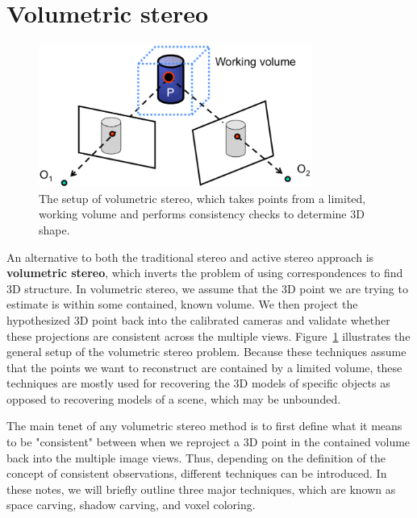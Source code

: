 \documentclass[a4paper, 12pt]{article}
\renewcommand\emph{\textbf}
\numberwithin{equation}{section}
\begin{document}
\section{Volumetric stereo}
\begin{figure}[h!]
    \centering
    \includegraphics[width = 0.8\textwidth]{figures/volumetric_setup.png}
    \caption{The setup of volumetric stereo, which takes points from a limited, working volume and performs consistency checks to determine 3D shape.}
    \label{fig:volumetric_setup}
\end{figure}
An alternative to both the traditional stereo and active stereo approach is \emph{volumetric stereo}, which inverts the problem of using correspondences to find 3D structure. In volumetric stereo, we assume that the 3D point we are trying to estimate is within some contained, known volume. We then project the hypothesized 3D point back into the calibrated cameras and validate whether these projections are consistent across the multiple views. Figure~\ref{fig:volumetric_setup} illustrates the general setup of the volumetric stereo problem. Because these techniques assume that the points we want to reconstruct are contained by a limited volume, these techniques are mostly used for recovering the 3D models of specific objects as opposed to recovering models of a scene, which may be unbounded. 

The main tenet of any volumetric stereo method is to first define what it means to be "consistent" between when we reproject a 3D point in the contained volume back into the multiple image views. Thus, depending on the definition of the concept of consistent observations, different techniques can be introduced. In these notes, we will briefly outline three major techniques, which are known as space carving, shadow carving, and voxel coloring.
\end{document}
